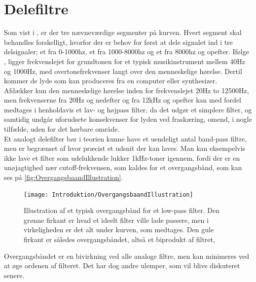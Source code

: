 \section{Delefiltre}
\label{Delefiltre}
Som vist i , er der tre nævneværdige segmenter på kurven. Hvert segment skal behandles forskelligt, hvorfor der er behov for først at dele signalet ind i tre delsignaler; et fra 0-1000hz, et fra 1000-8000hz og et fra 8000hz og opefter. Ifølge \textcite{PDF:Elektroakustik}, ligger frekvenslejet for grundtonen for et typisk musikinstrument mellem  40Hz og 1000Hz, med overtonefrekvenser langt over den menneskelige hørelse. Dertil kommer de lyde som kan produceres fra en computer eller synthesizer.\\\textcite{STD:ISO226} Afdækker kun den menneskelige hørelse inden for frekvenslejet 20Hz to 12500Hz, men frekvenserne fra 20Hz og nedefter og fra 12kHz og opefter kan med fordel medtages i henholdavis et lav- og højpass filter, da det udgør et simplere filter, og samtidig undgår uforudsete konsekvenser for lyden ved fraskæring, omend, i nogle tilfælde, uden for det hørbare område.\\
Et analogt delefilter bør i teorien kunne have et uendeligt antal band-pass filtre, men er begrænset af hvor præcist et udsnit der kan laves. Man kan eksempelvis ikke lave et filter som udelukkende lukker 1kHz-toner igennem, fordi der er en unøjagtighed nær cutoff-frekvensen, som kaldes for et overgangsbånd, som kan ses på \autoref{fig:OvergangsbaandIllustration}.
%
\begin{figure}[H]
	\centering
	\texttt{[image: Introduktion/OvergangsbaandIllustration]}	
	\caption{Illustration af et typisk overgangsbånd for et low-pass filter. Den grønne firkant er hvad et ideelt filter ville lade passere, men i virkeligheden er det alt under kurven, som medtages. Den gule firkant er således overgangsbåndet, altså et biprodukt af filtret,}
	\label{fig:OvergangsbaandIllustration}
\end{figure}
\noindent
%
Overgangsbåndet er en bivirkning ved alle analoge filtre, men kan minimeres ved at øge ordenen af filteret. Det har dog andre ulemper, som vil blive diskuteret senere.\\
%
%
%
